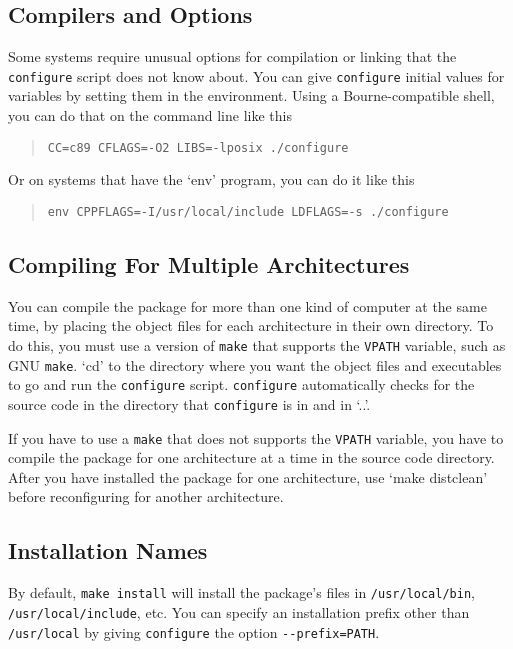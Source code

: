 \begin{appendix}
\subsection*{Compilers and Options}


   Some systems require unusual options for compilation or linking that
the \verb+configure+ script does not know about.  You can give \verb+configure+
initial values for variables by setting them in the environment.  Using
a Bourne-compatible shell, you can do that on the command line like
this
\begin{quote}
\verb+CC=c89 CFLAGS=-O2 LIBS=-lposix ./configure+
\end{quote}
Or on systems that have the `env' program, you can do it like this
\begin{quote}
\verb+env CPPFLAGS=-I/usr/local/include LDFLAGS=-s ./configure+
\end{quote}

\subsection*{Compiling For Multiple Architectures}

   You can compile the package for more than one kind of computer at the
same time, by placing the object files for each architecture in their
own directory.  To do this, you must use a version of \verb+make+ that
supports the \verb+VPATH+ variable, such as GNU \verb+make+.  `cd' to the
directory where you want the object files and executables to go and run
the \verb+configure+ script.  \verb+configure+ automatically checks for the
source code in the directory that \verb+configure+ is in and in `..'.

   If you have to use a \verb+make+ that does not supports the \verb+VPATH+
variable, you have to compile the package for one architecture at a time
in the source code directory.  After you have installed the package for
one architecture, use `make distclean' before reconfiguring for another
architecture.

\subsection*{Installation Names}

By default, \verb+make install+ will install the package's files in
\verb+/usr/local/bin+, \verb+/usr/local/include+, etc.  You can specify an
installation prefix other than \verb+/usr/local+ by giving \verb+configure+ the
option \verb+--prefix=PATH+.




\end{appendix}
